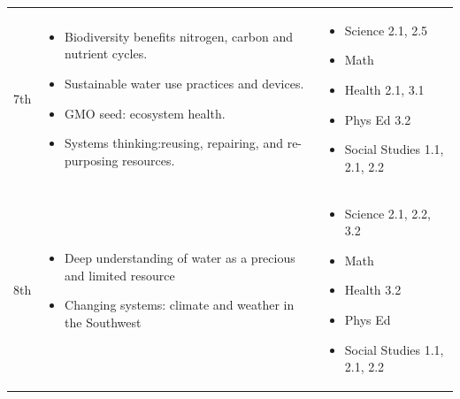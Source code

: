 \documentclass[12pt,]{article}
\providecommand{\tightlist}{%
  \setlength{\itemsep}{0pt}\setlength{\parskip}{0pt}}
\begin{document}
\begin{longtable}[]{@{}lll@{}}
\begin{minipage}[t]{0.09\columnwidth}\raggedright
7th\strut
\end{minipage} & \begin{minipage}[t]{0.44\columnwidth}\raggedright
\begin{itemize}
\tightlist
\item
  Biodiversity benefits nitrogen,
  carbon and nutrient cycles.
\item
  Sustainable water use practices
  and devices.
\item
  GMO seed: ecosystem health.
\item
  Systems thinking:reusing,
  repairing, and re-purposing
  resources.
\end{itemize}\strut
\end{minipage} & \begin{minipage}[t]{0.35\columnwidth}\raggedright
\begin{itemize}
\tightlist
\item
  Science 2.1, 2.5
\item
  Math
\item
  Health 2.1, 3.1
\item
  Phys Ed 3.2
\item
  Social Studies 1.1,
  2.1, 2.2
\end{itemize}\strut
\end{minipage}\tabularnewline
\begin{minipage}[t]{0.09\columnwidth}\raggedright
8th\strut
\end{minipage} & \begin{minipage}[t]{0.44\columnwidth}\raggedright
\begin{itemize}
\tightlist
\item
  Deep understanding of water as
  a precious and limited resource
\item
  Changing systems: climate and
  weather in the Southwest
\end{itemize}\strut
\end{minipage} & \begin{minipage}[t]{0.35\columnwidth}\raggedright
\begin{itemize}
\tightlist
\item
  Science 2.1, 2.2,
  3.2
\item
  Math
\item
  Health 3.2
\item
  Phys Ed
\item
  Social Studies 1.1,
  2.1, 2.2
\end{itemize}\strut
\end{minipage}\tabularnewline
\bottomrule
\end{longtable}
\end{document}
